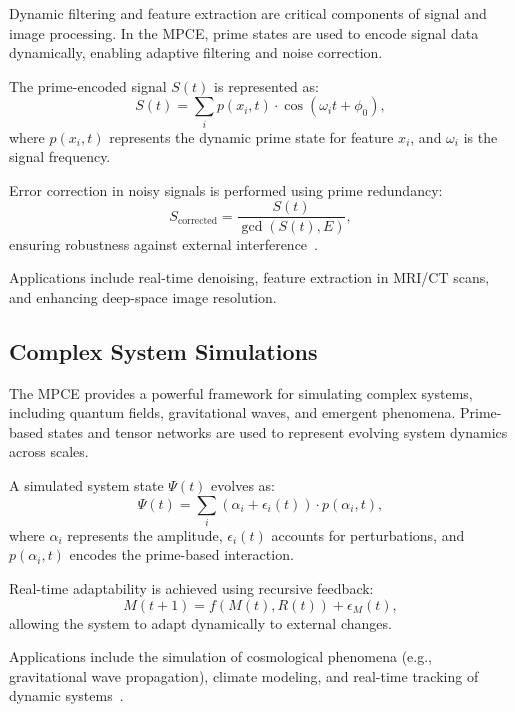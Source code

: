 \documentclass{article}
\theoremstyle{plain}
\begin{document}
Dynamic filtering and feature extraction are critical components of signal and image processing. In the MPCE, prime states are used to encode signal data dynamically, enabling adaptive filtering and noise correction.

The prime-encoded signal \( S(t) \) is represented as:
\begin{equation}
    S(t) = \sum_{i} p(x_i, t) \cdot \cos(\omega_i t + \phi_0),
\end{equation}
where \( p(x_i, t) \) represents the dynamic prime state for feature \( x_i \), and \( \omega_i \) is the signal frequency.

Error correction in noisy signals is performed using prime redundancy:
\begin{equation}
    S_{\text{corrected}} = \frac{S(t)}{\gcd(S(t), E)},
\end{equation}
ensuring robustness against external interference~\cite{haroche2013nobel, shor1994algorithms}.

Applications include real-time denoising, feature extraction in MRI/CT scans, and enhancing deep-space image resolution.

\subsection{Complex System Simulations}

The MPCE provides a powerful framework for simulating complex systems, including quantum fields, gravitational waves, and emergent phenomena. Prime-based states and tensor networks are used to represent evolving system dynamics across scales.

A simulated system state \( \Psi(t) \) evolves as:
\begin{equation}
    \Psi(t) = \sum_{i} \left( \alpha_i + \epsilon_i(t) \right) \cdot p(\alpha_i, t),
\end{equation}
where \( \alpha_i \) represents the amplitude, \( \epsilon_i(t) \) accounts for perturbations, and \( p(\alpha_i, t) \) encodes the prime-based interaction.

Real-time adaptability is achieved using recursive feedback:
\begin{equation}
    M(t+1) = f(M(t), R(t)) + \epsilon_M(t),
\end{equation}
allowing the system to adapt dynamically to external changes.

Applications include the simulation of cosmological phenomena (e.g., gravitational wave propagation), climate modeling, and real-time tracking of dynamic systems~\cite{feynman2010quantum, wang2021quantum}.
\end{document}
